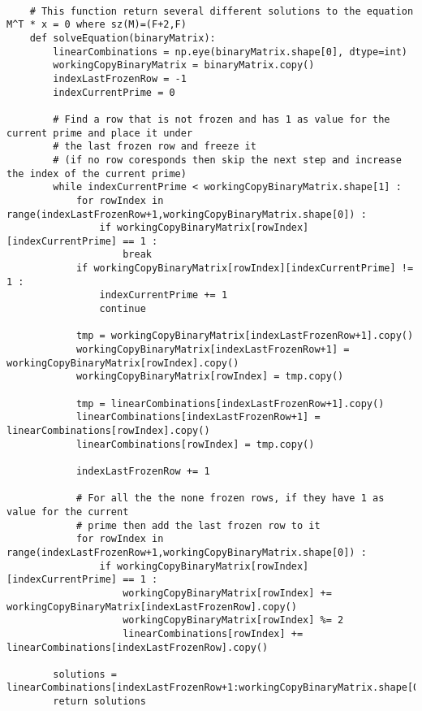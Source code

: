 \documentclass{article}
\begin{document}
\begin{verbatim}

    # This function return several different solutions to the equation M^T * x = 0 where sz(M)=(F+2,F)
    def solveEquation(binaryMatrix):
        linearCombinations = np.eye(binaryMatrix.shape[0], dtype=int)
        workingCopyBinaryMatrix = binaryMatrix.copy()
        indexLastFrozenRow = -1
        indexCurrentPrime = 0

        # Find a row that is not frozen and has 1 as value for the current prime and place it under 
        # the last frozen row and freeze it
        # (if no row coresponds then skip the next step and increase the index of the current prime)
        while indexCurrentPrime < workingCopyBinaryMatrix.shape[1] :
            for rowIndex in range(indexLastFrozenRow+1,workingCopyBinaryMatrix.shape[0]) :
                if workingCopyBinaryMatrix[rowIndex][indexCurrentPrime] == 1 :
                    break
            if workingCopyBinaryMatrix[rowIndex][indexCurrentPrime] != 1 :
                indexCurrentPrime += 1
                continue
        
            tmp = workingCopyBinaryMatrix[indexLastFrozenRow+1].copy()
            workingCopyBinaryMatrix[indexLastFrozenRow+1] = workingCopyBinaryMatrix[rowIndex].copy()
            workingCopyBinaryMatrix[rowIndex] = tmp.copy()
        
            tmp = linearCombinations[indexLastFrozenRow+1].copy()
            linearCombinations[indexLastFrozenRow+1] = linearCombinations[rowIndex].copy()
            linearCombinations[rowIndex] = tmp.copy()
        
            indexLastFrozenRow += 1
        
            # For all the the none frozen rows, if they have 1 as value for the current 
            # prime then add the last frozen row to it
            for rowIndex in range(indexLastFrozenRow+1,workingCopyBinaryMatrix.shape[0]) :
                if workingCopyBinaryMatrix[rowIndex][indexCurrentPrime] == 1 :
                    workingCopyBinaryMatrix[rowIndex] += workingCopyBinaryMatrix[indexLastFrozenRow].copy()
                    workingCopyBinaryMatrix[rowIndex] %= 2
                    linearCombinations[rowIndex] += linearCombinations[indexLastFrozenRow].copy()
        
        solutions = linearCombinations[indexLastFrozenRow+1:workingCopyBinaryMatrix.shape[0]]%2
        return solutions
\end{verbatim}
\end{document}
